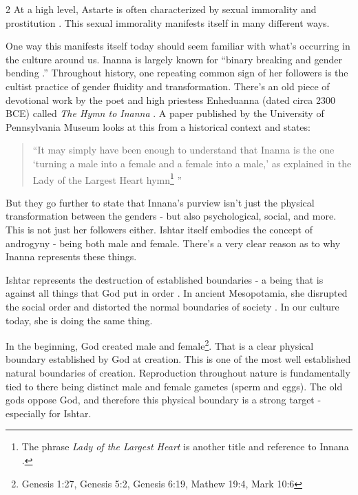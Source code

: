 \documentclass[10pt]{article}
\begin{document}
\begin{multicols}{2}
At a high level, Astarte is often characterized by sexual immorality and prostitution \cite{Astarte bible hub}. This sexual immorality manifests itself in many different ways. 

One way this manifests itself today should seem familiar with what's occurring in the culture around us. Inanna is largely known for ``binary breaking and gender bending \cite{Astarte Gender Fluidity}.'' Throughout history, one repeating common sign of her followers is the cultist practice of gender fluidity and transformation. There's an old piece of devotional work by the poet and high priestess Enheduanna (dated circa 2300 BCE) called \textit{The Hymn to Inanna} \cite{Hymn To Innana, Lady of Largest Heart}. A paper published by the University of Pennsylvania Museum looks at this from a historical context and states:
\begin{quotation}
``It may simply have been enough to understand that Inanna is the one ‘turning a male into a female and a female into a male,’ as explained in the Lady of the Largest Heart hymn\footnote{The phrase \textit{Lady of the Largest Heart} is another title and reference to Innana \cite{Lady of Largest Heart}.} \cite{Hymn To Innana}''
\end{quotation}
But they go further to state that Innana's purview isn't just the physical transformation between the genders - but also psychological, social, and more. This is not just her followers either. Ishtar itself embodies the concept of androgyny - being both male and female\cite{opposites}. There's a very clear reason as to why Inanna represents these things.

Ishtar represents the destruction of established boundaries - a being that is against all things that God put in order \cite{opposites, distortion}. In ancient Mesopotamia, she disrupted the social order and distorted the normal boundaries of society \cite{distortion}. In our culture today, she is doing the same thing. 

In the beginning, God created male and female\footnote{Genesis 1:27, Genesis 5:2, Genesis 6:19, Mathew 19:4, Mark 10:6}. That is a clear physical boundary established by God at creation. This is one of the most well established natural boundaries of creation. Reproduction throughout nature is fundamentally tied to there being distinct male and female gametes (sperm and eggs). The old gods oppose God, and therefore this physical boundary is a strong target - especially for Ishtar.


\end{multicols}
\end{document}
